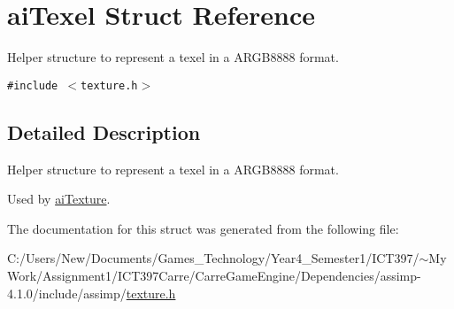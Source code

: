 \hypertarget{structai_texel}{
\section{aiTexel Struct Reference}
\label{structai_texel}
}
Helper structure to represent a texel in a ARGB8888 format.  


{\tt \#include $<$texture.h$>$}



\subsection{Detailed Description}
Helper structure to represent a texel in a ARGB8888 format. 

Used by \hyperlink{structai_texture}{aiTexture}. 

The documentation for this struct was generated from the following file:\begin{CompactItemize}
\item 
C:/Users/New/Documents/Games\_\-Technology/Year4\_\-Semester1/ICT397/$\sim$My Work/Assignment1/ICT397Carre/CarreGameEngine/Dependencies/assimp-4.1.0/include/assimp/\hyperlink{texture_8h}{texture.h}\end{CompactItemize}
